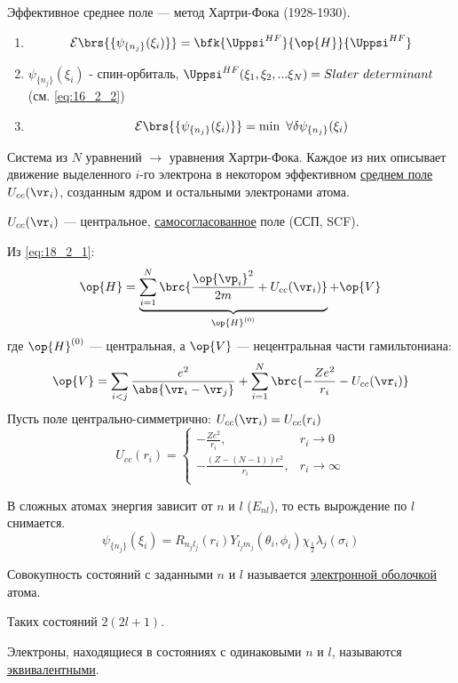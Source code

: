 Эффективное среднее поле --- метод Хартри-Фока (1928-1930).

\begin{enumerate}
\item \begin{equation}
\label{eq:18_2_2}
\mathcal{E}\brs{\{\psi_{\{n_j\}}(\xi_i)\}} = \bfk{\Uppsi^{HF}}{\op{H}}{\Uppsi^{HF}}
\end{equation}

\item $\psi_{\{n_j\}}(\xi_i)$ - спин-орбиталь,  $\Uppsi^{HF}(\xi_1, \xi_2, ... \xi_N) = Slater~determinant$ (см. \eqref{eq:16_2_2})

\item 
$$
\mathcal{E}\brs{\{\psi_{\{n_j\}}(\xi_i)\}} = \min~ \forall \delta\psi_{\{n_j\}}(\xi_i)
$$
\end{enumerate}

Система из $N$ уравнений $\to$ уравнения Хартри-Фока. Каждое из них описывает движение выделенного $i$-го электрона в некотором эффективном \underline{среднем поле} $U_{cc}(\vr_i)$, созданным ядром и остальными электронами атома. 

$U_{cc}(\vr_i)$ --- центральное, \underline{самосогласованное} поле (ССП, SCF).

Из \eqref{eq:18_2_1}:
$$
\op{H} = \underbrace{\sum_{i=1}^{N} \brc{\frac{\op{\vp_i}^2}{2m} + U_{cc}(\vr_i)}}_{\op{H}^{(0)}} + \op{V}
$$
где $\op{H}^{(0)}$ --- центральная, а $\op{V}$ --- нецентральная части гамильтониана:
$$
\op{V} = \sum_{i<j} \frac{e^2}{\abs{\vr_i - \vr_j}} + \sum_{i=1}^N \brc{-\frac{Ze^2}{r_i} - U_{cc}(\vr_i)}
$$
Пусть поле центрально-симметрично: $U_{cc}(\vr_i) = U_{cc}(r_i)$
$$
U_{cc}(r_i) =
\begin{cases}
-\frac{Ze^2}{r_i},& r_i \to 0\\
-\frac{(Z-(N-1))e^2}{r_i},& r_i \to \infty\\
\end{cases}
$$

В сложных атомах энергия зависит от $n$ и $l$ ($E_{nl}$), то есть вырождение по $l$ снимается.
$$
\psi_{\{n_j\}}(\xi_i) = R_{n_j l_j}(r_i) Y_{l_j m_j}(\theta_i, \phi_i) \chi_{\frac{1}{2}} \lambda_j(\sigma_i)
$$


\begin{defn}
Совокупность состояний с заданными $n$ и $l$ называется \underline{электронной оболочкой} атома.
\end{defn}

Таких состояний $2(2l + 1)$.

\begin{defn}
Электроны, находящиеся в состояниях с одинаковыми $n$ и $l$, называются \underline{эквивалентными}.
\end{defn}

